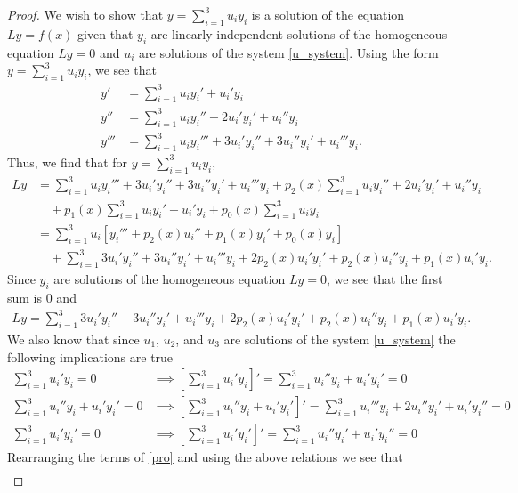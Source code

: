 \documentclass[12pt]{article}
\theoremstyle{definition}
\begin{document}
\begin{proof}
  We wish to show that $y = \sum_{i=1}^3 u_i y_i$ is a solution of the equation
  $Ly = f(x)$ given that $y_i$ are linearly independent solutions of the homogeneous
  equation $Ly = 0$ and $u_i$ are solutions of the system \eqref{u_system}.
  Using the form $y = \sum_{i=1}^3 u_i y_i$, we see that
  \begin{align*}
    y' &= \sum_{i=1}^3 u_i y_i' + u_i' y_i \\
    y'' &= \sum_{i=1}^3 u_i y_i'' + 2u_i'y_i' + u_i'' y_i \\
    y''' &= \sum_{i=1}^3 u_i y_i''' + 3u_i'y_i'' + 3u_i''y_i' + u_i''' y_i.
  \end{align*}
  Thus, we find that for $y = \sum_{i=1}^3 u_i y_i$,
  \begin{align*}
    Ly &= \sum_{i=1}^3 u_i y_i''' + 3u_i'y_i'' + 3u_i''y_i' + u_i''' y_i
    + p_2(x)\sum_{i=1}^3 u_i y_i'' + 2u_i'y_i' + u_i'' y_i \\
    &\quad + p_1(x)\sum_{i=1}^3 u_i y_i' + u_i' y_i
    + p_0(x)\sum_{i=1}^3 u_i y_i \\
    &= \sum_{i=1}^3 u_i[y_i''' + p_2(x)u_i'' + p_1(x)y_i' + p_0(x)y_i] \\
    &\quad + \sum_{i=1}^3 3u_i'y_i'' + 3u_i''y_i' + u_i'''y_i + 2p_2(x)u_i'y_i' + p_2(x)u_i''y_i + p_1(x)u_i'y_i.
  \end{align*}
  Since $y_i$ are solutions of the homogeneous equation $Ly = 0$, we see that the first sum is 0 and
  \begin{align}\label{pro}
    Ly = \sum_{i=1}^3 3u_i'y_i'' + 3u_i''y_i' + u_i'''y_i + 2p_2(x)u_i'y_i' + p_2(x)u_i''y_i + p_1(x)u_i'y_i.
  \end{align}
  We also know that since $u_1$, $u_2$, and $u_3$ are solutions of the system \eqref{u_system} the following implications are true
  \begin{align*}
    \sum_{i=1}^3 u_i'y_i = 0 &\implies \left[\sum_{i=1}^3 u_i'y_i\right]' = \sum_{i=1}^3 u_i''y_i + u_i'y_i' = 0 \\
    \sum_{i=1}^3 u_i''y_i + u_i'y_i' = 0 &\implies \left[\sum_{i=1}^3 u_i''y_i + u_i'y_i'\right]' = \sum_{i=1}^3 u_i'''y_i + 2u_i''y_i' + u_i'y_i'' = 0 \\
    \sum_{i=1}^3 u_i'y_i' = 0 &\implies \left[\sum_{i=1}^3 u_i'y_i'\right]' = \sum_{i=1}^3 u_i''y_i' + u_i'y_i'' = 0
  \end{align*}
  Rearranging the terms of \eqref{pro} and using the above relations we see that
  \begin{align*}

\end{align*}
\end{proof}
\end{document}

